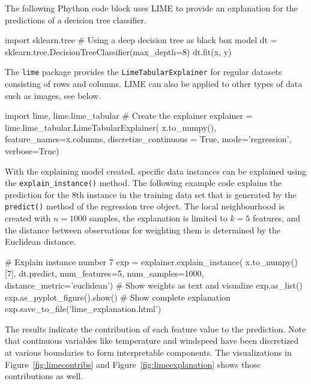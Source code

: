 \begin{withcode}
The following Phython code block uses LIME to provide an explanation for the predictions of a decision tree classifier. 

\begin{pythoncode}
import sklearn.tree
# Using a deep decision tree as black box model
dt = sklearn.tree.DecisionTreeClassifier(max_depth=8)
dt.fit(x, y)
\end{pythoncode}

The \texttt{lime} package provides the \texttt{LimeTabularExplainer} for regular datasets consisting of rows and columns. LIME can also be applied to other types of data such as images, see below.

\begin{pythoncode}
import lime, lime.lime_tabular
# Create the explainer
explainer = lime.lime_tabular.LimeTabularExplainer(
    x.to_numpy(), 
    feature_names=x.columns, 
    discretize_continuous = True, 
    mode='regression', 
    verbose=True)
\end{pythoncode}

With the explaining model created, specific data instances can be explained using the \texttt{explain\_instance()} method. The following example code explains the prediction for the 8th instance in the training data set that is generated by the \texttt{predict()} method of the regression tree object. The local neighbourhood is created with $n=1000$ samples, the explanation is limited to $k=5$ features, and the distance between observations for weighting them is determined by the Euclidean distance.

\begin{pythoncode}
# Explain instance number 7
exp = explainer.explain_instance( 
    x.to_numpy()[7], 
    dt.predict, 
    num_features=5, 
    num_samples=1000, 
    distance_metric='euclidean')
# Show weights as text and visualize
exp.as_list()
exp.as_pyplot_figure().show()
# Show complete explanation
exp.save_to_file('lime_explanation.html')
\end{pythoncode}

The results indicate the contribution of each feature value to the prediction. Note that continuous variables like temperature and windspeed have been discretized at various boundaries to form interpretable components. The visualizations in Figure~\ref{fig:limecontribs} and Figure~\ref{fig:limeexplanation} shows those contributions as well. 

\begin{textcode}
[('temp <= 7.84', -1738.6611673589232), 
 ('mnth_MAR <= 0.00', 640.903016649792), 
 ('weekday_THU <= 0.00', -532.3918204920352), 
 ('windspeed > 15.63', 493.90993722141997), 
 ('season_SPRING <= 0.00', -333.38496260796086)]
\end{textcode}


\end{withcode}
